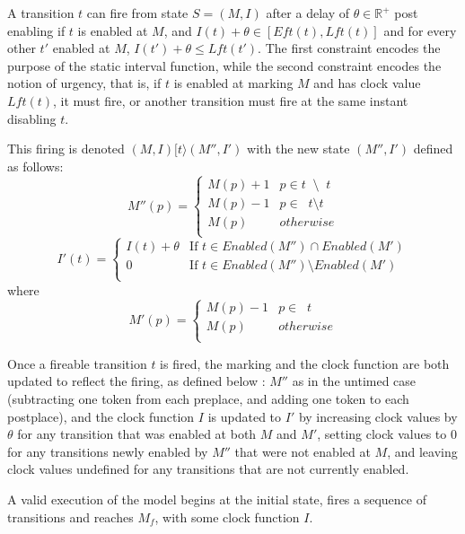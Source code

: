 \documentclass[conference]{IEEEtran}
\newcounter{cases}
\DeclareMathOperator*{\pre}{^\bullet}
\begin{document}
    A transition $t$ can fire from state $S = (M, I)$ after a delay of $\theta \in \mathbb{R}^+$ post enabling 
    if $t$ is enabled at $M$, and $I(t) + \theta \in [Eft(t), Lft(t)]$ and for
    every other \(t'\) enabled at \(M\), $I(t') + \theta \leq Lft(t')$.
    The first constraint encodes the purpose of the static interval function, while the second constraint encodes the notion of urgency, that is, if $t$ is enabled at marking $M$ and has clock value $Lft(t)$, it must fire, or another transition must fire at the same instant disabling $t$.  

    This firing is denoted $(M, I)[t\rangle(M'', I')$ with the new state $(M'', I')$ defined as follows:
    $$M''(p) = \begin{cases}
        M(p) + 1 &  p \in t \pre \setminus \pre t\\
        M(p) - 1 & p \in \pre t \setminus t \pre\\
        M(p) & otherwise\\
    \end{cases}$$ 
    $$I'(t) =
    \begin{cases}
        I(t) + \theta & \textrm{If } t \in Enabled(M'') \cap Enabled(M')\\
        0 & \textrm{If } t \in Enabled(M'') \setminus Enabled(M')\\
    \end{cases}$$
where  $$M'(p) = \begin{cases}
        M(p) - 1 & p \in \pre t \\
        M(p) & otherwise\\
    \end{cases}$$ 

    Once a fireable transition $t$ is fired, the marking and the clock function are both updated to reflect the firing, as defined below : 
$M''$ as in the untimed case (subtracting one token from each preplace, and adding one token to each postplace), and the clock function $I$ is updated to $I'$ by increasing clock values by $\theta$ for any transition that was enabled at both $M$ and $M'$, setting clock values to 0 for any transitions newly enabled by $M''$ that were not enabled at $M$, and leaving clock values undefined for any transitions that are not currently enabled. 
    
    A valid execution of the model begins at the initial state, fires a sequence of transitions %
    and reaches $M_f$, with some clock function $I$. 
\end{document}
